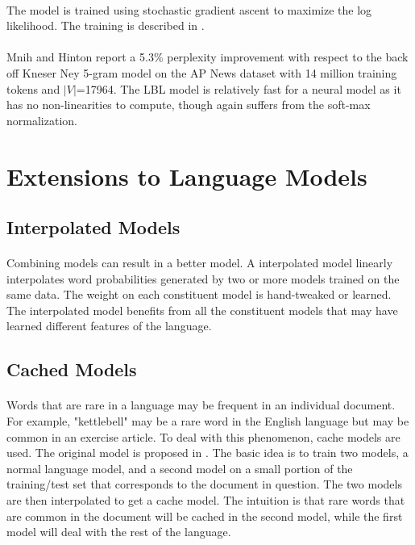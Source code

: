 \paragraph{}
The model is trained using stochastic gradient ascent to maximize the log likelihood. The training is described in \cite{MnihHinton2007}.
\paragraph{}
Mnih and Hinton report a 5.3\% perplexity improvement with respect to the back off Kneser Ney 5-gram model on the AP News dataset with 14 million training tokens and $|V|$=17964. The LBL model is relatively fast for a neural model as it has no non-linearities to compute, though again suffers from the soft-max normalization. 

\section {Extensions to Language Models}
\subsection{Interpolated Models}
\paragraph{}
Combining models can result in a better model. A interpolated model linearly interpolates word probabilities generated by two or more models trained on the same data. The weight on each constituent model is hand-tweaked or learned. The interpolated model benefits from all the constituent models that may have learned different features of the language.
\subsection{Cached Models}
\paragraph{}
Words that are rare in a language may be frequent in an individual document. For example, "kettlebell" may be a rare word in the English language but may be common in an exercise article. To deal with this phenomenon, cache models are used. The original model is proposed in \cite{Kuhn1990}. The basic idea is to train two models, a normal language model, and a second model on a small portion of the training/test set that corresponds to the document in question. The two models are then interpolated to get a cache model. The intuition is that rare words that are common in the document will be cached in the second model, while the first model will deal with the rest of the language.

